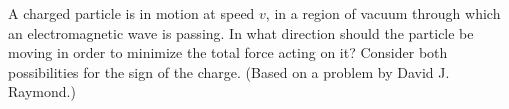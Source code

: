 A charged particle is in motion at speed $v$, in a region of vacuum through which 
        an electromagnetic wave is passing. In what direction should the particle be moving in order
        to minimize the total force acting on it? Consider both possibilities for the
        sign of the charge. (Based on a problem by David J. Raymond.)
